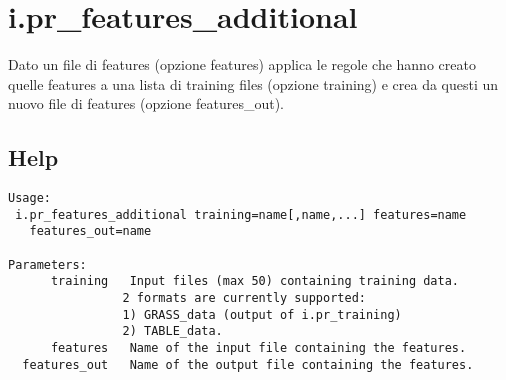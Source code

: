 \section*{i.pr\_features\_additional}
Dato un file di features (opzione features) applica le regole che
hanno creato quelle features a una lista di training files (opzione
training) e crea da questi un nuovo file di features (opzione
features\_out).

\subsection*{Help}
\begin{verbatim}
Usage:
 i.pr_features_additional training=name[,name,...] features=name
   features_out=name

Parameters:
      training   Input files (max 50) containing training data.
                2 formats are currently supported:
                1) GRASS_data (output of i.pr_training)
                2) TABLE_data.
      features   Name of the input file containing the features.
  features_out   Name of the output file containing the features.
\end{verbatim}

